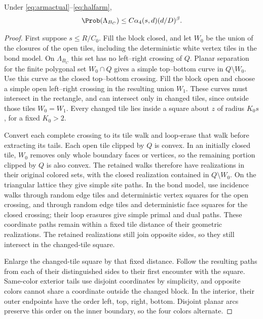 \begin{lemma}\label{lem:sidebound}
Under \eqref{eq:armactual}--\eqref{eq:halfarm},
\begin{equation}\label{eq:sidebound}
 \Prob(\Lambda_{B_C})\le C\alpha_4(s,d)(d/D)^\beta.
\end{equation}
\end{lemma}
\begin{proof}
First suppose $s\le R/C_0$. Fill the block closed, and let $W_0$ be the union of the closures of the open tiles, including the deterministic white vertex tiles in the bond model. On $\Lambda_{B_C}$ this set has no left--right crossing of $Q$. Planar separation for the finite polygonal set $W_0\cap Q$ gives a simple top--bottom curve in $Q\setminus W_0$. Use this curve as the closed top--bottom crossing. Fill the block open and choose a simple open left--right crossing in the resulting union $W_1$. These curves must intersect in the rectangle, and can intersect only in changed tiles, since outside those tiles $W_0=W_1$. Every changed tile lies inside a square about $z$ of radius $K_0s$, for a fixed $K_0>2$.

Convert each complete crossing to its tile walk and loop-erase that walk before extracting its tails. Each open tile clipped by $Q$ is convex. In an initially closed tile, $W_0$ removes only whole boundary faces or vertices, so the remaining portion clipped by $Q$ is also convex. The retained walks therefore have realizations in their original colored sets, with the closed realization contained in $Q\setminus W_0$. On the triangular lattice they give simple site paths. In the bond model, use incidence walks through random edge tiles and deterministic vertex squares for the open crossing, and through random edge tiles and deterministic face squares for the closed crossing; their loop erasures give simple primal and dual paths. These coordinate paths remain within a fixed tile distance of their geometric realizations. The retained realizations still join opposite sides, so they still intersect in the changed-tile square.

Enlarge the changed-tile square by that fixed distance. Follow the resulting paths from each of their distinguished sides to their first encounter with the square. Same-color exterior tails use disjoint coordinates by simplicity, and opposite colors cannot share a coordinate outside the changed block. In the interior, their outer endpoints have the order left, top, right, bottom. Disjoint planar arcs preserve this order on the inner boundary, so the four colors alternate.


\end{proof}
